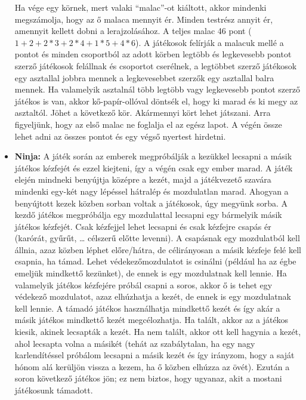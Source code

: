 \documentclass[a4paper, 12pt, twoside, openright]{article}
\begin{document}
\begin{itemize}
Ha vége egy körnek, mert valaki ``malac''-ot kiáltott, akkor mindenki megszámolja, hogy az ő malaca mennyit ér. Minden testrész annyit ér, amennyit kellett dobni a lerajzolásához. A teljes malac 46 pont ($1+2+2*3+2*4+1*5+4*6$). A játékosok felírják a malacuk mellé a pontot és minden csoportból az adott körben legtöbb és legkevesebb pontot szerző játékosok felállnak és csoportot cserélnek, a legtöbbet szerző játékosok egy asztallal jobbra mennek a legkevesebbet szerzők egy asztallal balra mennek. Ha valamelyik asztalnál több legtöbb vagy legkevesebb pontot szerző játékos is van, akkor kő-papír-ollóval döntsék el, hogy ki marad és ki megy az asztaltól. Jöhet a következő kör. Akármennyi kört lehet játszani. Arra figyeljünk, hogy az első malac ne foglalja el az egész lapot. A végén össze lehet adni az összes pontot és egy végső nyertest hirdetni.

\item \textbf{Ninja:} A játék során az emberek megpróbálják a kezükkel lecsapni a másik játékos kézfejét és ezzel kiejteni, így a végén csak egy ember marad. A játék elején mindneki benyújtja középre a kezét, majd a játékvezető szavára mindenki egy-két nagy lépéssel hátralép és mozdulatlan marad. Ahogyan a benyújtott kezek közben sorban voltak a játékosok, úgy megyünk sorba. A kezdő játékos megpróbálja egy mozdulattal lecsapni egy bármelyik másik játékos kézfejét. Csak kézfejjel lehet lecsapni és csak kézfejre csapás ér (karórát, gyűrűt, \dots{} célszerű előtte levenni). A csapásnak egy mozdulatból kell állnia, azaz közben léphet előre/hátra, de célirányosan a másik kézfeje felé kell csapnia, ha támad. Lehet védekezőmozdulatot is csinálni (például ha az égbe emeljük mindkettő kezünket), de ennek is egy mozdulatnak kell lennie. Ha valamelyik játékos kézfejére próbál csapni a soros, akkor ő is tehet egy védekező mozdulatot, azaz elhúzhatja a kezét, de ennek is egy mozdulatnak kell lennie. A támadó játékos használhatja mindkettő kezét és így akár a másik játékos mindkettő kezét megcélozhatja. Ha talált, akkor az a játékos kiesik, akinek lecsapták a kezét. Ha nem talált, akkor ott kell hagynia a kezét, ahol lecsapta volna a másikét (tehát az szabálytalan, ha egy nagy karlendítéssel próbálom lecsapni a másik kezét és így irányzom, hogy a saját hónom alá kerüljön vissza a kezem, ha ő közben elhúzza az övét). Ezután a soron következő játékos jön; ez nem biztos, hogy ugyanaz, akit a mostani játékosunk támadott.


\end{itemize}
\end{document}
